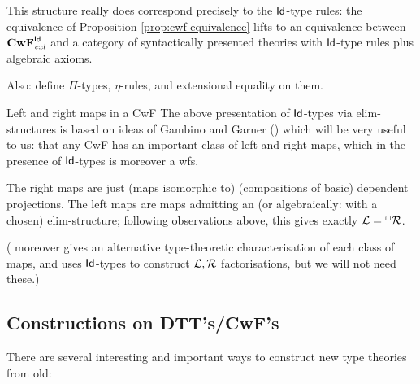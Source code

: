 \documentclass{amsart}
\begin{document}
\begin{proposition} This structure really does correspond precisely to the $\mathsf{Id}$-type rules: the equivalence of Proposition \ref{prop:cwf-equivalence} lifts to an equivalence between $\mathbf{CwF}^{\mathsf{Id}}_{\mathit{cxl}}$ and a category of syntactically presented theories with $\mathsf{Id}$-type rules plus algebraic axioms. 
\end{proposition}

Also: define $\Pi$-types, $\eta$-rules, and extensional equality on them. 

\begin{para}{Left and right maps in a CwF} \label{subsec:left-right-in-cwf}
The above presentation of $\mathsf{Id}$-types via elim-structures is based on ideas of Gambino and Garner (\cite{gambino-garner}) which will be very useful to us: that any CwF has an important class of left and right maps, which in the presence of $\mathsf{Id}$-types is moreover a wfs.

The right maps are just (maps isomorphic to) (compositions of basic) dependent projections.  The left maps are maps admitting an (or algebraically: with a chosen) elim-structure; following observations above, this gives exactly $\mathcal{L} = {}^\pitchfork \mathcal{R}$.  

(\cite{gambino-garner} moreover gives an alternative type-theoretic characterisation of each class of maps, and uses $\mathsf{Id}$-types to construct $\mathcal{L},\mathcal{R}$ factorisations, but we will not need these.)
\end{para}


\subsection{Constructions on DTT's/CwF's}

There are several interesting and important ways to construct new type theories from old:
\end{document}
